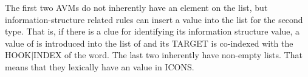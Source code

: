 

\noindent The first two AVMs do not inherently have an 
element on the  list, but
information-structure related rules can insert a value into the list
for the second type.  That is, if there is a clue for identifying its
information structure value, a value of  is introduced
into the list of  and its TARGET is co-indexed with the
HOOK{$\mid$}INDEX of the word.  The last two inherently have non-empty
 lists. That means that they lexically have an
 value in ICONS.



